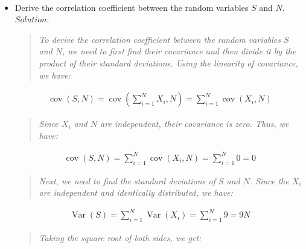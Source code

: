 \documentclass[a4paper]{article}
\begin{document}
        \\
        \\
        \\
        \\
        \\
        \\
        \begin{itemize}
        \item Derive the correlation coefficient between the random variables $S$ and $N$.\\
        $Solution:$
        \begin{quote}
            \emph{To derive the correlation coefficient between the random variables $S$ and $N$, we need to first find their covariance and then divide it by the product of their standard deviations. Using the linearity of covariance, we have:}
        \end{quote}

        \begin{align*}
            \operatorname{cov}(S, N) = \operatorname{cov}\left(\sum_{i=1}^{N} X_{i}, N\right) = \sum_{i=1}^{N} \operatorname{cov}(X_{i}, N)
        \end{align*}
        
        \begin{quote}
            \emph{Since $X_{i}$ and $N$ are independent, their covariance is zero. Thus, we have:}
        \end{quote}
        
        \begin{align*}
            \operatorname{cov}(S, N) = \sum_{i=1}^{N} \operatorname{cov}(X_{i}, N) = \sum_{i=1}^{N} 0 = 0
        \end{align*}
        
        \begin{quote}
            \emph{Next, we need to find the standard deviations of $S$ and $N$. Since the $X_{i}$ are independent and identically distributed, we have:}
        \end{quote}
        
        \begin{align*}
            \operatorname{Var}(S) = \sum_{i=1}^{N} \operatorname{Var}(X_{i}) = \sum_{i=1}^{N} 9 = 9N
        \end{align*}
        
        \begin{quote}
            \emph{Taking the square root of both sides, we get:}
        \end{quote}
        

\end{itemize}
\end{document}
